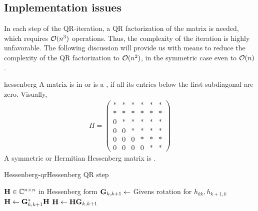 \subsection{Implementation issues}
\begin{intro}
  In each step of the QR-iteration, a QR factorization of the matrix
  is needed, which requires $\mathcal O(n^3)$ operations. Thus, the
  complexity of the iteration is highly unfavorable. The following
  discussion will provide us with means to reduce the complexity of
  the QR factorization to $\mathcal O(n^2)$, in the symmetric case even to
  $\mathcal O(n)$.
\end{intro}

\begin{Definition}{hessenberg}
  A matrix is in  or is a , if all its entries below the first subdiagonal are zero. Visually,
  \begin{gather}
    H =
    \begin{pmatrix}
      *&*&*&*&*&*\\
      *&*&*&*&*&*\\
      0&*&*&*&*&*\\
      0&0&*&*&*&*\\
      0&0&0&*&*&*\\
      0&0&0&0&*&*
    \end{pmatrix}
  \end{gather}
  A symmetric or Hermitian Hessenberg matrix is .
\end{Definition}

\begin{Algorithm*}{Hessenberg-qr}{Hessenberg QR step}
  \begin{algorithmic}[1]
    \Require $\mathbf H\in\mathbb C^{n\times n}$ in Hessenberg form
    \State $\mathbf G_{k,k+1} \gets$ Givens rotation for $h_{kk},h_{k+1,k}$
    \State $\mathbf H\gets \mathbf G^*_{k,k+1}\mathbf H$
    \EndFor
    \Comment{$\matH = \matr\matq$}
    \State $\mathbf H\gets \mathbf H\mathbf G_{k,k+1}$
    \EndFor
  \end{algorithmic}
\end{Algorithm*}

